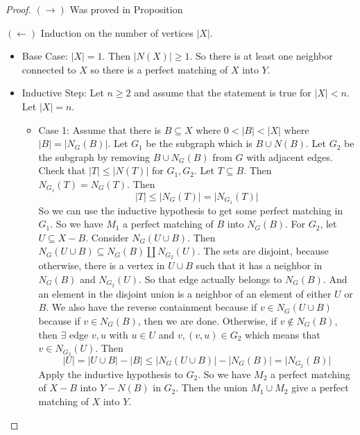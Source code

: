 \documentclass{report}
\begin{document}
    \begin{proof}
        $(\rightarrow)$ Was proved in Proposition

        $(\leftarrow)$ Induction on the number of vertices $\lvert X \rvert$. 
            \begin{itemize}
                \item Base Case: $\lvert X \rvert = 1$. Then $\lvert N(X) \rvert \geq 1$. So there is at least one neighbor connected to $X$ so there is a perfect matching of $X$ into $Y$.

                \item Inductive Step: Let $n \geq 2$ and assume that the statement is true for $\lvert X \rvert < n$. Let $\lvert X \rvert = n$. 
                    \begin{itemize}
                        \item Case 1: Assume that there is $B \subseteq X$ where $0 < \lvert B \rvert < \lvert X \rvert$ where $\lvert B \rvert = \lvert N_{G}(B) \rvert$. Let $G_{1}$ be the subgraph which is $B \cup N(B)$. Let $G_{2}$ be the subgraph by removing $B \cup N_{G}(B)$ from $G$ with adjacent edges. Check that $\lvert T \rvert \leq \lvert N(T) \rvert $ for $G_{1}, G_{2}$. Let $T \subseteq B$. Then $N_{G_{1}}(T) = N_{G}(T)$. Then
                            \begin{equation*}
                                \lvert T \rvert \leq \lvert N_{G}(T) \rvert = \lvert N_{G_{1}}(T) \rvert
                            \end{equation*}
                        So we can use the inductive hypothesis to get some perfect matching in $G_{1}$. So we have $M_{1}$ a perfect matching of $B$ into $N_{G}(B)$. For $G_{2}$, let $U \subseteq X - B$. Consider $N_{G}(U \cup B)$. Then $N_{G}(U \cup B) \subseteq N_{G}(B) \coprod N_{G_{2}}(U)$. The sets are disjoint, because otherwise, there is a vertex in $U \cup B$ such that it has a neighbor in $N_{G}(B)$ and $N_{G_{2}}(U)$. So that edge actually belongs to $N_{G}(B)$. And an element in the disjoint union is a neighbor of an element of either $U$ or $B$. We also have the reverse containment because if $v \in N_{G}(U \cup B)$ because if $v \in N_{G}(B)$, then we are done. Otherwise, if $v \notin N_{G}(B)$, then $\exists$ edge $v, u$ with $u \in U$ and $v, (v, u) \in G_{2}$ which means that $v \in N_{G_{2}}(U)$. Then 
                            \begin{equation*}
                                \lvert U \rvert = \lvert U \cup B \rvert - \lvert B \rvert \leq \lvert N_{G}(U \cup B) \rvert - \lvert N_{G}(B) \rvert = \lvert N_{G_{2}}(B) \rvert
                            \end{equation*}
                         Apply the inductive hypothesis to $G_{2}$. So we have $M_{2}$ a perfect matching of $X - B$ into $Y - N(B)$ in $G_{2}$. Then the union $M_{1} \cup M_{2}$ give a perfect matching of $X$ into $Y$.


\end{itemize}
\end{itemize}
\end{proof}
\end{document}
